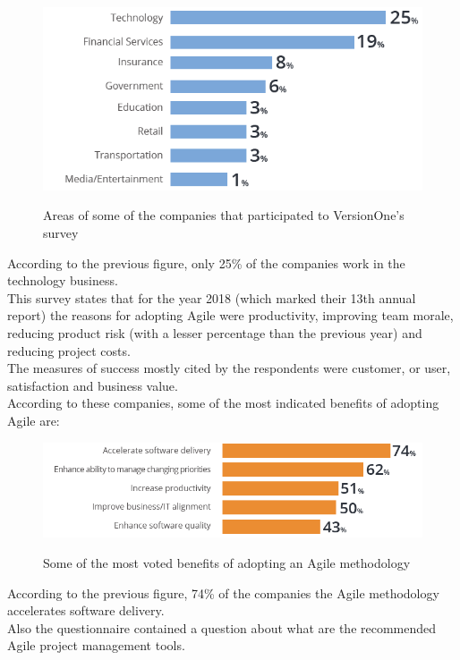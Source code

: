 	\begin{figure}[H]
		\centering
		\includegraphics[width=.8\textwidth]{resources/Untitled_2}\\
		\caption{Areas of some of the companies that participated to VersionOne's survey}
	\end{figure}
	According to the previous figure\cite{state-of-agile}, only 25\% of the companies work in the technology business.\\
	This survey states that for the year 2018 (which marked their 13th annual report) the reasons for adopting Agile were productivity, improving team morale, reducing product risk (with a lesser percentage than the previous year) and reducing project costs.\\
	The measures of success mostly cited by the respondents were customer, or user, satisfaction and business value.\\
	According to these companies, some of the most indicated benefits of adopting Agile are:
	\begin{figure}[H]
		\centering
		\includegraphics[width=.9\textwidth]{resources/Untitled}\\
		\caption{Some of the most voted benefits of adopting an Agile methodology}
	\end{figure}
	According to the previous figure\cite{state-of-agile}, 74\% of the companies the Agile methodology accelerates software delivery.\\
	Also the questionnaire contained a question about what are the recommended Agile project management tools.

